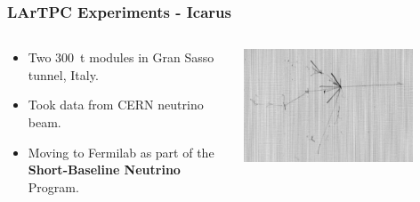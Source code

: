 \documentclass[xcolor=dvipsnames]{beamer}
\begin{document}
\begin{frame}
  \frametitle{LArTPC Experiments - Icarus}

  \begin{columns}
    \begin{column}{0.5\textwidth}
      \begin{itemize}
      \item Two \SI{300}{\tonne} modules in Gran Sasso tunnel, Italy.
      \item Took data from CERN neutrino beam.
      \item Moving to Fermilab as part of the \textbf{Short-Baseline
        Neutrino} Program.
      \end{itemize}
    \end{column}
    \begin{column}{0.5\textwidth}
      \includegraphics[width=0.8\textwidth]{icarus.png}
    \end{column}
  \end{columns}
\end{frame}
\end{document}
